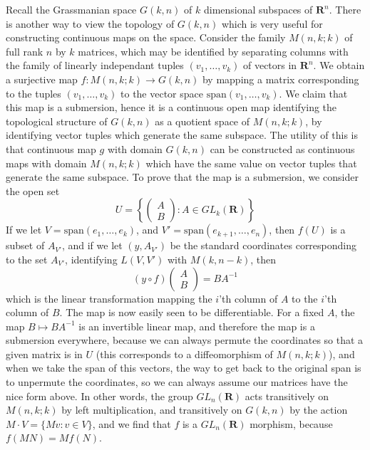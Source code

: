\begin{example}
    Recall the Grassmanian space $G(k,n)$ of $k$ dimensional subspaces of $\mathbf{R}^n$. There is another way to view the topology of $G(k,n)$ which is very useful for constructing continuous maps on the space. Consider the family $M(n,k;k)$ of full rank $n$ by $k$ matrices, which may be identified by separating columns with the family of linearly independant tuples $(v_1, \dots, v_k)$ of vectors in $\mathbf{R}^n$. We obtain a surjective map $f: M(n,k;k) \to G(k,n)$ by mapping a matrix corresponding to the tuples $(v_1, \dots, v_k)$ to the vector space $\text{span}(v_1, \dots, v_k)$. We claim that this map is a submersion, hence it is a continuous open map identifying the topological structure of $G(k,n)$ as a quotient space of $M(n,k;k)$, by identifying vector tuples which generate the same subspace. The utility of this is that continuous map $g$ with domain $G(k,n)$ can be constructed as continuous maps with domain $M(n,k;k)$ which have the same value on vector tuples that generate the same subspace. To prove that the map is a submersion, we consider the open set
    \[ U = \left\{ \begin{pmatrix} A \\ B \end{pmatrix}: A \in GL_k(\mathbf{R}) \right\} \]
    If we let $V = \text{span}(e_1, \dots, e_k)$, and $V' = \text{span}(e_{k+1}, \dots, e_n)$, then $f(U)$ is a subset of $A_{V'}$, and if we let $(y,A_{V'})$ be the standard coordinates corresponding to the set $A_{V'}$, identifying $L(V,V')$ with $M(k,n-k)$, then
    \[ (y \circ f) \begin{pmatrix} A \\ B \end{pmatrix} = BA^{-1} \]
    which is the linear transformation mapping the $i$'th column of $A$ to the $i$'th column of $B$. The map is now easily seen to be differentiable. For a fixed $A$, the map $B \mapsto BA^{-1}$ is an invertible linear map, and therefore the map is a submersion everywhere, because we can always permute the coordinates so that a given matrix is in $U$ (this corresponds to a diffeomorphism of $M(n,k;k)$), and when we take the span of this vectors, the way to get back to the original span is to unpermute the coordinates, so we can always assume our matrices have the nice form above. In other words, the group $GL_n(\mathbf{R})$ acts transitively on $M(n,k;k)$ by left multiplication, and transitively on $G(k,n)$ by the action $M \cdot V = \{ Mv : v \in V \}$, and we find that $f$ is a $GL_n(\mathbf{R})$ morphism, because $f(MN) = Mf(N)$.
\end{example}




